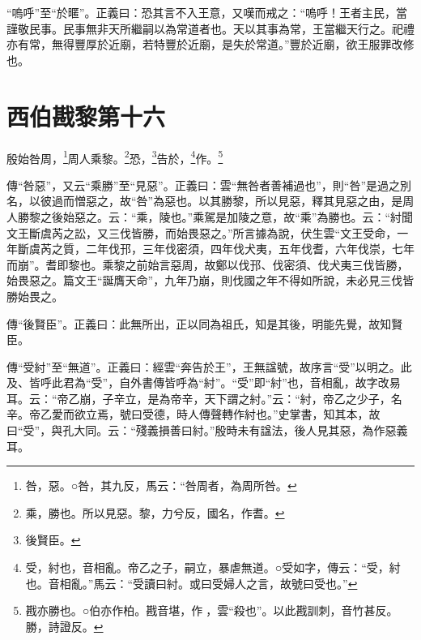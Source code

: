 {\noindent\shu{}\fzkt “嗚呼”至“於暱”。正義曰：恐其言不入王意，又嘆而戒之：“嗚呼！王者主民，當謹敬民事。民事無非天所繼嗣以為常道者也。天以其事為常，王當繼天行之。祀禮亦有常，無得豐厚於近廟，若特豐於近廟，是失於常道。”豐於近廟，欲王服罪改修也。 \par}

\section{西伯戡黎第十六}


殷始咎周，\footnote{咎，惡。○咎，其九反，馬云：“咎周者，為周所咎。}周人乘黎。\footnote{乘，勝也。所以見惡。黎，力兮反，國名，作耆。}恐，\footnote{後賢臣。}告於，\footnote{受，紂也，音相亂。帝乙之子，嗣立，暴虐無道。○受如字，傳云：“受，紂也。音相亂。”馬云：“受讀曰紂。或曰受婦人之言，故號曰受也。”}作。\footnote{戡亦勝也。○伯亦作柏。戡音堪，作𢦟，雲“殺也”。以此戡訓刺，音竹甚反。勝，詩證反。}

{\noindent\zhuan{}\fzbyks 傳“咎惡”，又云“乘勝”至“見惡”。正義曰：雲“無咎者善補過也”，則“咎”是過之別名，以彼過而憎惡之，故“咎”為惡也。以其勝黎，所以見惡，釋其見惡之由，是周人勝黎之後始惡之。云：“乘，陵也。”乘駕是加陵之意，故“乘”為勝也。云：“紂聞文王斷虞芮之訟，又三伐皆勝，而始畏惡之。”所言據為說，伏生雲“文王受命，一年斷虞芮之質，二年伐邘，三年伐密須，四年伐犬夷，五年伐耆，六年伐崇，七年而崩”。耆即黎也。乘黎之前始言惡周，故鄭以伐邘、伐密須、伐犬夷三伐皆勝，始畏惡之。篇文王“誕膺天命”，九年乃崩，則伐國之年不得如所說，未必見三伐皆勝始畏之。 \par}

{\noindent\zhuan{}\fzbyks 傳“後賢臣”。正義曰：此無所出，正以同為祖氏，知是其後，明能先覺，故知賢臣。 \par}

{\noindent\zhuan{}\fzbyks 傳“受紂”至“無道”。正義曰：經雲“奔告於王”，王無諡號，故序言“受”以明之。此及、皆呼此君為“受”，自外書傳皆呼為“紂”。“受”即“紂”也，音相亂，故字改易耳。云：“帝乙崩，子辛立，是為帝辛，天下謂之紂。”云：“紂，帝乙之少子，名辛。帝乙愛而欲立焉，號曰受德，時人傳聲轉作紂也。”史掌書，知其本，故曰“受”，與孔大同。云：“殘義損善曰紂。”殷時未有諡法，後人見其惡，為作惡義耳。 \par}

